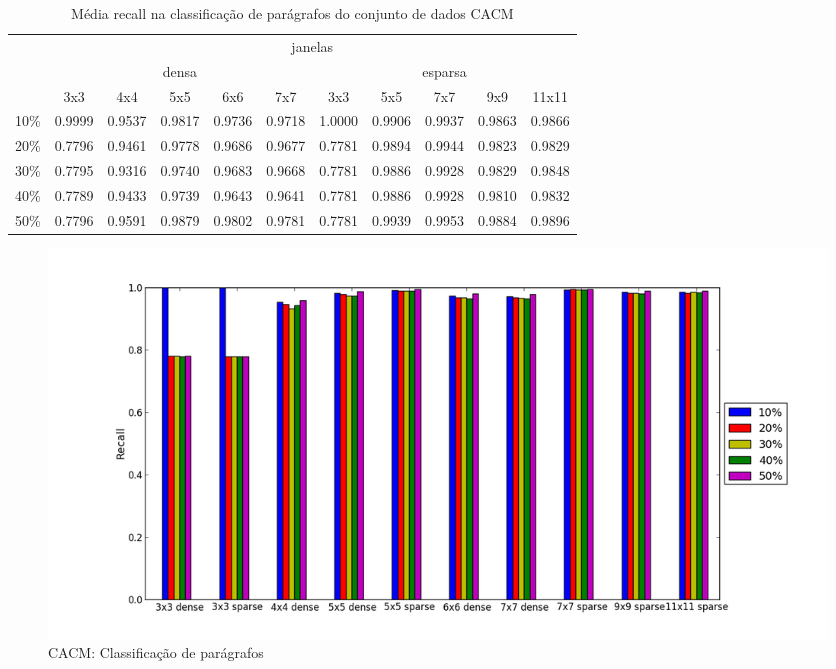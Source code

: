 \documentclass[a4paper,11pt]{article}
\begin{document}
  \begin{center}
    \begin{table}[p]
      \caption{Média recall na classificação de parágrafos do conjunto de dados CACM}
      \begin{tabular}{ l | c c c c c || c c c c c | }
        \cline{2-11}
        & \multicolumn{10}{|c|}{janelas} \\
        \cline{2-11}
        & \multicolumn{5}{c||}{densa} & \multicolumn{5}{c|}{esparsa} \\
        \cline{2-11}
        & 3x3 & 4x4 & 5x5 & 6x6 & 7x7 & 3x3 & 5x5 & 7x7 & 9x9 & 11x11 \\
        \hline
        \multicolumn{1}{|l|}{10\%}& 0.9999& 0.9537& 0.9817& 0.9736& 0.9718& 1.0000& 0.9906& 0.9937& 0.9863& 0.9866\\
        \multicolumn{1}{|l|}{20\%}& 0.7796& 0.9461& 0.9778& 0.9686& 0.9677& 0.7781& 0.9894& 0.9944& 0.9823& 0.9829\\
        \multicolumn{1}{|l|}{30\%}& 0.7795& 0.9316& 0.9740& 0.9683& 0.9668& 0.7781& 0.9886& 0.9928& 0.9829& 0.9848\\
        \multicolumn{1}{|l|}{40\%}& 0.7789& 0.9433& 0.9739& 0.9643& 0.9641& 0.7781& 0.9886& 0.9928& 0.9810& 0.9832\\
        \multicolumn{1}{|l|}{50\%}& 0.7796& 0.9591& 0.9879& 0.9802& 0.9781& 0.7781& 0.9939& 0.9953& 0.9884& 0.9896\\
        \hline  
      \end{tabular}
    \end{table}
  \end{center}

  \begin{figure}[p]
    \centerline{\includegraphics[width=1.2\textwidth]{assets/experiment_charts/cacm_TextRegion_paragraph_recall_or_sensitivity.png}}
    \caption{CACM: Classificação de parágrafos}
    \label{fig:cacm_TextRegion_paragraph_recall_or_sensitivity}
  \end{figure}
\end{document}
